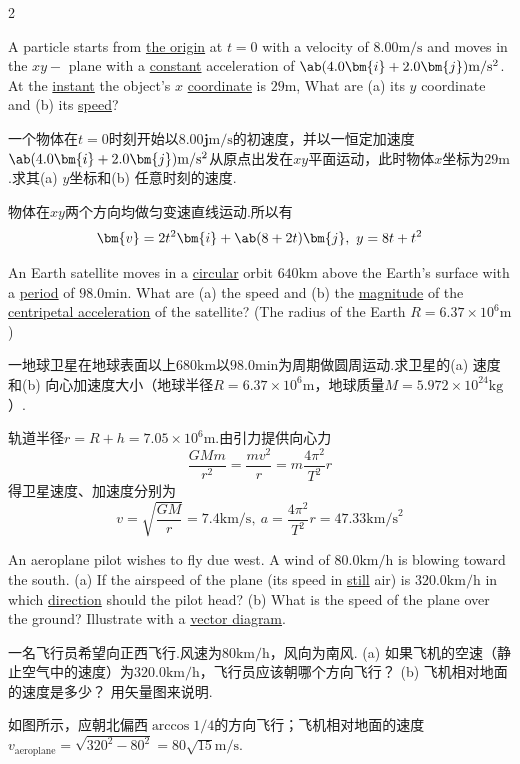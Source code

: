{\begin{multicols}{2}
\begin{problem}
  A particle starts from \underline{the origin} at $t=0$ with a velocity of $8.00\mathrm{m/s}$ and moves in the $xy-$ plane with a \underline{constant} acceleration of $\ab(4.0\bm{i}+2.0\bm{j})\mathrm{m}/\mathrm{s}^2$. At the \underline{instant} the object’s $x$ \underline{coordinate} is $29\mathrm{m}$, What are (a) its $y$ coordinate and (b) its \underline{speed}?
\end{problem}
\begin{translation}
  一个物体在$t=0$时刻开始以$8.00\bm{j}\mathrm{m/s}$的初速度，并以一恒定加速度$\ab(4.0\bm{i}+2.0\bm{j})\mathrm{m}/\mathrm{s}^2$从原点出发在$xy$平面运动，此时物体$x$坐标为$29\mathrm{m}$.求其(a) $y$坐标和(b) 任意时刻的速度.
\end{translation}
\begin{solution}
    物体在$xy$两个方向均做匀变速直线运动.所以有
    $$\bm{v}=2t^2\bm{i}+\ab(8+2t)\bm{j},\ y=8t+t^2$$
\end{solution}

\begin{problem}
    An Earth satellite moves in a \underline{circular} orbit $640\mathrm{km}$ above the Earth’s surface with a \underline{period} of $98.0\mathrm{min}$⁡. What are (a) the speed and (b) the \underline{magnitude} of the \underline{centripetal acceleration} of the satellite? (The radius of the Earth $R=6.37\times10^6\mathrm{m}$)
\end{problem}
\begin{translation}
    一地球卫星在地球表面以上$680\mathrm{km}$以$98.0\mathrm{min}$为周期做圆周运动.求卫星的(a) 速度和(b) 向心加速度大小（地球半径$R=6.37\times 10^6\mathrm{m}$，地球质量$M=5.972\times 10^{24}\mathrm{kg}$）.
\end{translation}
\begin{solution}
    轨道半径$r=R+h=7.05\times 10^{6}\mathrm{m}$.由引力提供向心力
    $$\frac{GMm}{r^2}=\frac{mv^2}{r}=m\frac{4\pi^2}{T^2}r$$
    得卫星速度、加速度分别为
    $$v=\sqrt{\frac{GM}{r}}=7.4\mathrm{km/s},\ a=\frac{4\pi^2}{T^2}r=47.33\mathrm{km/s}^2$$
\end{solution}

\begin{problem}
    An aeroplane pilot wishes to fly due west. A wind of $80.0\mathrm{km/h}$ is blowing toward the south. (a) If the airspeed of the plane (its speed in \underline{still} air) is $320.0\mathrm{km/h}$ in which \underline{direction} should the pilot head? (b) What is the speed of the plane over the ground? Illustrate with a \underline{vector diagram}.
\end{problem}
\begin{translation}
    一名飞行员希望向正西飞行.风速为$80\mathrm{km/h}$，风向为南风. (a) 如果飞机的空速（静止空气中的速度）为$320.0\mathrm{km/h}$，飞行员应该朝哪个方向飞行？ (b) 飞机相对地面的速度是多少？ 用矢量图来说明.
\end{translation}
\begin{solution}
如图所示，应朝北偏西$\arccos{1/4}$的方向飞行；飞机相对地面的速度$v_{\text{aeroplane}}=\sqrt{320^2-80^2}=80\sqrt{15}\mathrm{m/s}$.


\end{solution}
\end{multicols}}

